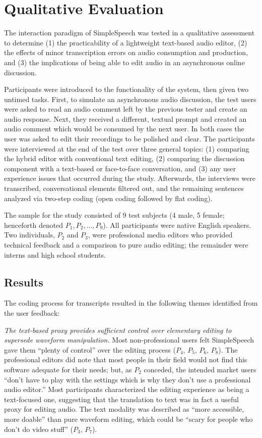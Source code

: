 \section{Qualitative Evaluation}

The interaction paradigm of SimpleSpeech was tested in a qualitative assessment to determine (1) the practicability of a lightweight text-based audio editor, (2) the effects of minor transcription errors on audio consumption and production, and (3) the implications of being able to edit audio in an asynchronous online discussion.

Participants were introduced to the functionality of the system, then given two untimed tasks. 
First, to simulate an asynchronous audio discussion, the test users were asked to read an audio comment left by the previous tester and create an audio response. 
Next, they received a different, textual prompt and created an audio comment which would be consumed by the next user. 
In both cases the user was asked to edit their recordings to be polished and clear.
The participants were interviewed at the end of the test over three general topics: (1) comparing the hybrid editor with conventional text editing, (2) comparing the discussion component with a text-based or face-to-face conversation, and (3) any user experience issues that occurred during the study. 
Afterwards, the interviews were transcribed, conversational elements filtered out, and the remaining sentences analyzed via two-step coding (open coding followed by flat coding). 

The sample for the study consisted of 9 test subjects (4 male, 5 female; henceforth denoted $P_1, P_2, \ldots, P_9$). 
All participants were native English speakers. 
Two individuals, $P_2$ and $P_3$, were professional media editors who provided technical feedback and a comparison to pure audio editing; the remainder were interns and high school students.

\subsection{Results}
The coding process for transcripts resulted in the following themes identified from the user feedback:

\emph{The text-based proxy provides sufficient control over elementary editing to supersede waveform manipulation.}
Most non-professional users felt SimpleSpeech gave them ``plenty of control'' over the editing process ($P_4,\,P_5,\,P_6,\,P_8$). 
The professional editors did note that most people in their field would not find this software adequate for their needs; but, as $P_2$ conceded, the intended market users ``don't have to play with the settings which is why they don't use a professional audio editor.''
Most participants characterized the editing experience as being a text-focused one, suggesting that the translation to text was in fact a useful proxy for editing audio. 
The text modality was described as ``more accessible, more doable'' than pure waveform editing, which could be ``scary for people who don't do video stuff'' ($P_3,\,P_7$). 

